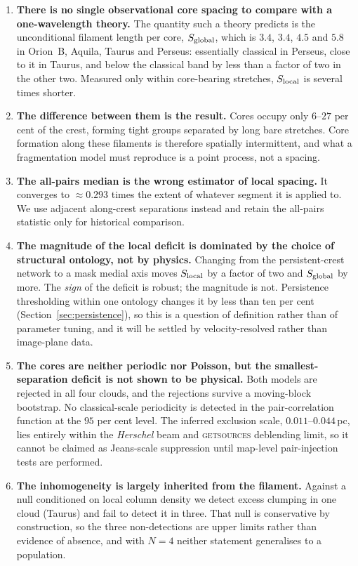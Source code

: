 \documentclass[usenatbib,twoside,twocolumn]{mnras}
\begin{document}
\begin{enumerate}\setlength{\itemsep}{2pt}
\item \textbf{There is no single observational core spacing to compare with a one-wavelength theory.} The quantity such a theory predicts is the unconditional filament length per core, $S_{\rm global}$, which is $3.4$, $3.4$, $4.5$ and $5.8$ in Orion~B, Aquila, Taurus and Perseus: essentially classical in Perseus, close to it in Taurus, and below the classical band by less than a factor of two in the other two. Measured only within core-bearing stretches, $S_{\rm local}$ is several times shorter.
\item \textbf{The difference between them is the result.} Cores occupy only $6$--$27$ per cent of the crest, forming tight groups separated by long bare stretches. Core formation along these filaments is therefore spatially intermittent, and what a fragmentation model must reproduce is a point process, not a spacing.
\item \textbf{The all-pairs median is the wrong estimator of local spacing.} It converges to $\approx0.293$ times the extent of whatever segment it is applied to. We use adjacent along-crest separations instead and retain the all-pairs statistic only for historical comparison.
\item \textbf{The magnitude of the local deficit is dominated by the choice of structural ontology, not by physics.} Changing from the persistent-crest network to a mask medial axis moves $S_{\rm local}$ by a factor of two and $S_{\rm global}$ by more. The \emph{sign} of the deficit is robust; the magnitude is not. Persistence thresholding within one ontology changes it by less than ten per cent (Section~\ref{sec:persistence}), so this is a question of definition rather than of parameter tuning, and it will be settled by velocity-resolved rather than image-plane data.
\item \textbf{The cores are neither periodic nor Poisson, but the smallest-separation deficit is not shown to be physical.} Both models are rejected in all four clouds, and the rejections survive a moving-block bootstrap. No classical-scale periodicity is detected in the pair-correlation function at the $95$ per cent level. The inferred exclusion scale, $0.011$--$0.044$\,pc, lies entirely within the \textit{Herschel} beam and \textsc{getsources} deblending limit, so it cannot be claimed as Jeans-scale suppression until map-level pair-injection tests are performed.
\item \textbf{The inhomogeneity is largely inherited from the filament.} Against a null conditioned on local column density we detect excess clumping in one cloud (Taurus) and fail to detect it in three. That null is conservative by construction, so the three non-detections are upper limits rather than evidence of absence, and with $N=4$ neither statement generalises to a population.

\end{enumerate}
\end{document}

